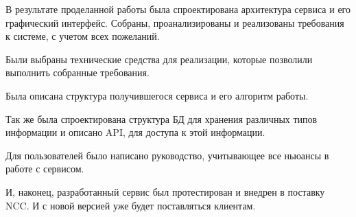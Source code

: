 \Conclusion %

В результате проделанной работы была спроектирована архитектура сервиса и его графический интерфейс.
Собраны, проанализированы и реализованы требования к системе, с учетом всех пожеланий.

Были выбраны технические средства для реализации, которые позволили выполнить собранные требования.

Была описана структура получившегося сервиса и его алгоритм работы.

Так же была спроектирована структура БД для хранения различных типов информации и описано API,
для доступа к этой информации.

Для пользователей было написано руководство, учитывающее все ньюансы в работе с сервисом.

И, наконец, разработанный сервис был протестирован и внедрен в поставку NCC\@.
И с новой версией уже будет поставляться клиентам.
